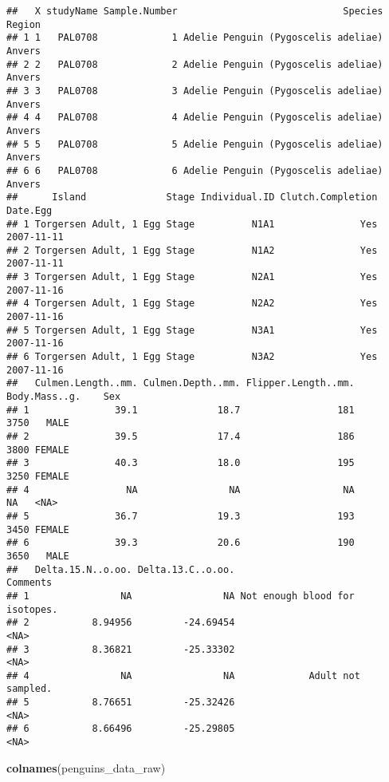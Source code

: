 \documentclass[
]{article}
\newenvironment{Shaded}{\begin{snugshade}}{\end{snugshade}}
\newcommand{\FunctionTok}[1]{\textcolor[rgb]{0.13,0.29,0.53}{\textbf{#1}}}
\newcommand{\NormalTok}[1]{#1}
\begin{document}
\begin{verbatim}
##   X studyName Sample.Number                             Species Region
## 1 1   PAL0708             1 Adelie Penguin (Pygoscelis adeliae) Anvers
## 2 2   PAL0708             2 Adelie Penguin (Pygoscelis adeliae) Anvers
## 3 3   PAL0708             3 Adelie Penguin (Pygoscelis adeliae) Anvers
## 4 4   PAL0708             4 Adelie Penguin (Pygoscelis adeliae) Anvers
## 5 5   PAL0708             5 Adelie Penguin (Pygoscelis adeliae) Anvers
## 6 6   PAL0708             6 Adelie Penguin (Pygoscelis adeliae) Anvers
##      Island              Stage Individual.ID Clutch.Completion   Date.Egg
## 1 Torgersen Adult, 1 Egg Stage          N1A1               Yes 2007-11-11
## 2 Torgersen Adult, 1 Egg Stage          N1A2               Yes 2007-11-11
## 3 Torgersen Adult, 1 Egg Stage          N2A1               Yes 2007-11-16
## 4 Torgersen Adult, 1 Egg Stage          N2A2               Yes 2007-11-16
## 5 Torgersen Adult, 1 Egg Stage          N3A1               Yes 2007-11-16
## 6 Torgersen Adult, 1 Egg Stage          N3A2               Yes 2007-11-16
##   Culmen.Length..mm. Culmen.Depth..mm. Flipper.Length..mm. Body.Mass..g.    Sex
## 1               39.1              18.7                 181          3750   MALE
## 2               39.5              17.4                 186          3800 FEMALE
## 3               40.3              18.0                 195          3250 FEMALE
## 4                 NA                NA                  NA            NA   <NA>
## 5               36.7              19.3                 193          3450 FEMALE
## 6               39.3              20.6                 190          3650   MALE
##   Delta.15.N..o.oo. Delta.13.C..o.oo.                       Comments
## 1                NA                NA Not enough blood for isotopes.
## 2           8.94956         -24.69454                           <NA>
## 3           8.36821         -25.33302                           <NA>
## 4                NA                NA             Adult not sampled.
## 5           8.76651         -25.32426                           <NA>
## 6           8.66496         -25.29805                           <NA>
\end{verbatim}

\begin{Shaded}
\begin{Highlighting}[]
\FunctionTok{colnames}\NormalTok{(penguins\_data\_raw)}
\end{Highlighting}
\end{Shaded}
\end{document}
